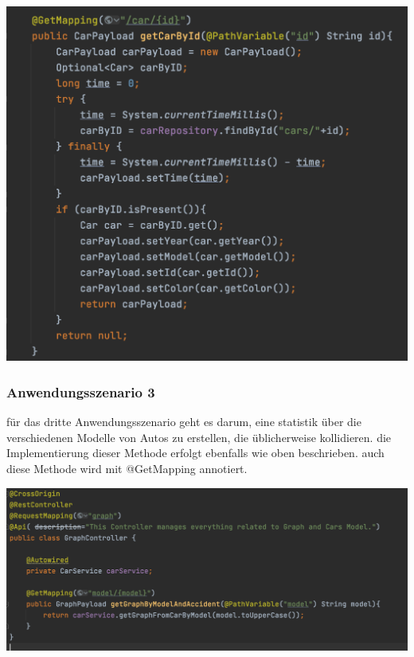 \begin{center}
\includegraphics[scale=.4]{images/carById}
\end{center}

\subsubsection{Anwendungsszenario 3}

für das dritte Anwendungsszenario geht es darum, eine statistik über die verschiedenen Modelle von Autos zu erstellen, die üblicherweise kollidieren. die Implementierung dieser Methode erfolgt ebenfalls wie oben beschrieben. auch diese Methode wird mit @GetMapping annotiert.

\begin{center}
\includegraphics[scale=.4]{images/carModel}
\end{center}